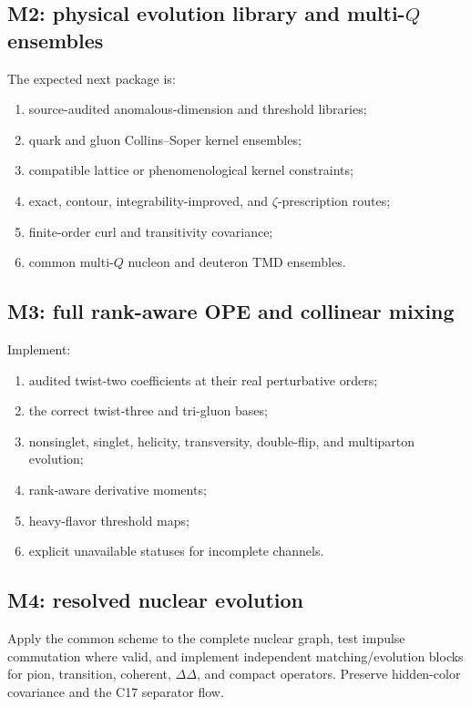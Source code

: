 \documentclass[11pt]{article}
\begin{document}
\subsection{M2: physical evolution library and multi-\texorpdfstring{\(Q\)}{Q} ensembles}

The expected next package is:
\begin{enumerate}
\item source-audited anomalous-dimension and threshold libraries;
\item quark and gluon Collins--Soper kernel ensembles;
\item compatible lattice or phenomenological kernel constraints;
\item exact, contour, integrability-improved, and \(\zeta\)-prescription routes;
\item finite-order curl and transitivity covariance;
\item common multi-\(Q\) nucleon and deuteron TMD ensembles.
\end{enumerate}

\subsection{M3: full rank-aware OPE and collinear mixing}

Implement:
\begin{enumerate}
\item audited twist-two coefficients at their real perturbative orders;
\item the correct twist-three and tri-gluon bases;
\item nonsinglet, singlet, helicity, transversity, double-flip, and multiparton evolution;
\item rank-aware derivative moments;
\item heavy-flavor threshold maps;
\item explicit unavailable statuses for incomplete channels.
\end{enumerate}

\subsection{M4: resolved nuclear evolution}

Apply the common scheme to the complete nuclear graph, test impulse commutation where valid, and implement independent matching/evolution blocks for pion, transition, coherent, \(\Delta\Delta\), and compact operators.  Preserve hidden-color covariance and the C17 separator flow.
\end{document}
